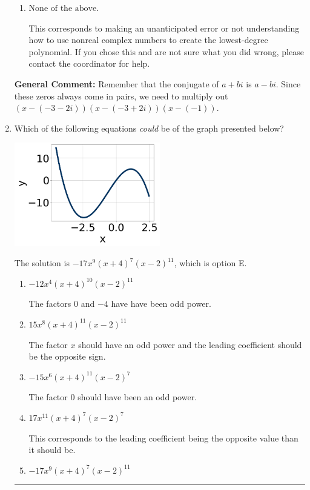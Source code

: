 \documentclass{extbook}[14pt]
\newcommand{\litem}[1]{\item #1

\rule{\textwidth}{0.4pt}}
\begin{document}
\begin{enumerate}
{\begin{enumerate}[label=\Alph*.]
$x^{3} -7 x^{2} +19 x -13$, which corresponds to multiplying out $(x-(-3 - 2 i))(x-(-3 + 2 i))(x -1)$.
\item \( \text{None of the above.} \)

This corresponds to making an unanticipated error or not understanding how to use nonreal complex numbers to create the lowest-degree polynomial. If you chose this and are not sure what you did wrong, please contact the coordinator for help.
\end{enumerate}

\textbf{General Comment:} Remember that the conjugate of $a+bi$ is $a-bi$. Since these zeros always come in pairs, we need to multiply out $(x-(-3 - 2 i))(x-(-3 + 2 i))(x-(-1))$.
}
\litem{
Which of the following equations \textit{could} be of the graph presented below?

\begin{center}
    \includegraphics[width=0.5\textwidth]{../Figures/polyGraphToFunctionB.png}
\end{center}


The solution is \( -17x^{9} (x + 4)^{7} (x - 2)^{11} \), which is option E.\begin{enumerate}[label=\Alph*.]
\item \( -12x^{4} (x + 4)^{10} (x - 2)^{11} \)

The factors $0$ and $-4$ have have been odd power.
\item \( 15x^{8} (x + 4)^{11} (x - 2)^{11} \)

The factor $x$ should have an odd power and the leading coefficient should be the opposite sign.
\item \( -15x^{6} (x + 4)^{11} (x - 2)^{7} \)

The factor $0$ should have been an odd power.
\item \( 17x^{11} (x + 4)^{7} (x - 2)^{7} \)

This corresponds to the leading coefficient being the opposite value than it should be.
\item \( -17x^{9} (x + 4)^{7} (x - 2)^{11} \)


\end{enumerate}}
\end{enumerate}
\end{document}
